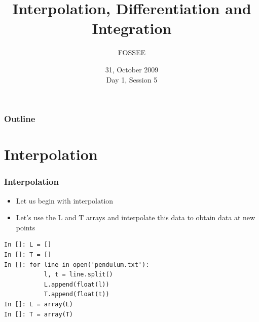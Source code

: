 \documentclass[14pt,compress]{beamer}
\title[Basic Python]{Interpolation, Differentiation and Integration}
\author[FOSSEE] {FOSSEE}
\institute[IIT Bombay] {Department of Aerospace Engineering\\IIT Bombay}
\date[] {31, October 2009\\Day 1, Session 5}
\newcommand{\typ}[1]{\lstinline{#1}}
\begin{document}
\begin{frame}
  \titlepage
\end{frame}

\begin{frame}
  \frametitle{Outline}
  \tableofcontents
\end{frame}

\section{Interpolation}

\begin{frame}[fragile]
\frametitle{Interpolation}
\begin{itemize}
\item Let us begin with interpolation
\item Let's use the L and T arrays and interpolate this data to obtain data at new points
\end{itemize}
\begin{lstlisting}
In []: L = []
In []: T = []
In []: for line in open('pendulum.txt'):
           l, t = line.split()
           L.append(float(l))
           T.append(float(t))
In []: L = array(L)
In []: T = array(T)
\end{lstlisting}
\end{frame}


\end{document}
